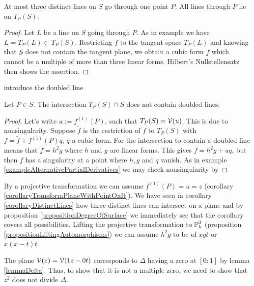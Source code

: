 \begin{lemma}
At most three distinct lines on $S$ go through one point $P$.
All lines through $P$ lie on $T_P(S)$.
\end{lemma}
\begin{proof}
Let $L$ be a line on $S$ going through $P$.
As in example \label{exampleTangentPlaneOfLinearSubsets} we have $L = T_P(L) \subset T_P(S)$.
Restricting $f$ to the tangent space $T_P(L)$ and knowing that $S$ does not contain the tangent plane, we obtain a cubic form $\widetilde f$ which cannot be a multiple of more than three linear forms.
Hilbert's Nullstellensatz then shows the assertion.
\end{proof}

\begin{lemma}
\begin{todo}\item introduce the doubled line \end{todo}
Let $P \in S$. The intersection $T_P(S) \cap S$ does not contain doubled lines.
\end{lemma}
\begin{proof}

Let's write $u := f^{(1)}(P)$, such that $T_P(S) = \operatorname{\mathcal V}(u)$.
This is due to nonsingularity. Suppose $\widetilde f$ is the restriction of $f$ to $T_P(S)$ with $f = \widetilde f + f^{(1)}(P)q$, $q$ a cubic form.
For the intersection to contain a doubled line means that $\widetilde f = h^2g$ where $h$ and $g$ are linear forms.
This gives $f = h^2g + uq$, but then $f$ has a singularity at a point where $h,g$ and $q$ vanish.
As in example \ref{exampleAlternativePartialDerivatives} we may check nonsingularity by 
\end{proof}

By a projective transformation we can assume $f^{(1)}(P) = u = z$ (corollary \ref{corollaryTransformPlaneWithPointOnIt}).
We have seen in corollary \ref{corollaryDistinctLines} how three distinct lines can intersect on a plane and by proposition \ref{propositionDegreeOfSurface} we immediately see that the corollary covers all possibilities.
Lifting the projective transformation to $\operatorname{\mathbb P}^3_k$ (proposition \ref{propositionLiftingAutomorphisms}) we can assume $h^2g$ to be of $xyt$ or $x(x-t)t$.

The plane $\operatorname{\mathcal V}(z) = \operatorname{\mathcal V}(1z- 0t)$ corresponds to $\Delta$ having a zero at $[0:1]$ by lemma \ref{lemmaDelta}.
Thus, to show that it is not a multiple zero, we need to show that $z^2$ does not divide $\Delta$.

